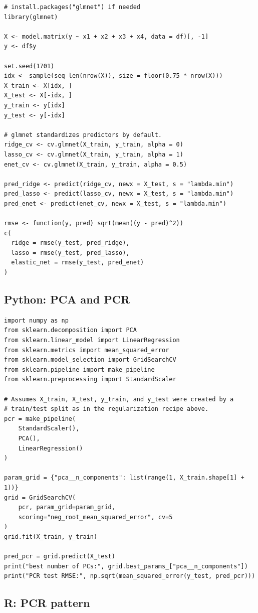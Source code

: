 \begin{verbatim}
# install.packages("glmnet") if needed
library(glmnet)

X <- model.matrix(y ~ x1 + x2 + x3 + x4, data = df)[, -1]
y <- df$y

set.seed(1701)
idx <- sample(seq_len(nrow(X)), size = floor(0.75 * nrow(X)))
X_train <- X[idx, ]
X_test <- X[-idx, ]
y_train <- y[idx]
y_test <- y[-idx]

# glmnet standardizes predictors by default.
ridge_cv <- cv.glmnet(X_train, y_train, alpha = 0)
lasso_cv <- cv.glmnet(X_train, y_train, alpha = 1)
enet_cv <- cv.glmnet(X_train, y_train, alpha = 0.5)

pred_ridge <- predict(ridge_cv, newx = X_test, s = "lambda.min")
pred_lasso <- predict(lasso_cv, newx = X_test, s = "lambda.min")
pred_enet <- predict(enet_cv, newx = X_test, s = "lambda.min")

rmse <- function(y, pred) sqrt(mean((y - pred)^2))
c(
  ridge = rmse(y_test, pred_ridge),
  lasso = rmse(y_test, pred_lasso),
  elastic_net = rmse(y_test, pred_enet)
)
\end{verbatim}

\subsection*{Python: PCA and PCR}

\begin{verbatim}
import numpy as np
from sklearn.decomposition import PCA
from sklearn.linear_model import LinearRegression
from sklearn.metrics import mean_squared_error
from sklearn.model_selection import GridSearchCV
from sklearn.pipeline import make_pipeline
from sklearn.preprocessing import StandardScaler

# Assumes X_train, X_test, y_train, and y_test were created by a
# train/test split as in the regularization recipe above.
pcr = make_pipeline(
    StandardScaler(),
    PCA(),
    LinearRegression()
)

param_grid = {"pca__n_components": list(range(1, X_train.shape[1] + 1))}
grid = GridSearchCV(
    pcr, param_grid=param_grid,
    scoring="neg_root_mean_squared_error", cv=5
)
grid.fit(X_train, y_train)

pred_pcr = grid.predict(X_test)
print("best number of PCs:", grid.best_params_["pca__n_components"])
print("PCR test RMSE:", np.sqrt(mean_squared_error(y_test, pred_pcr)))
\end{verbatim}

\subsection*{R: PCR pattern}

